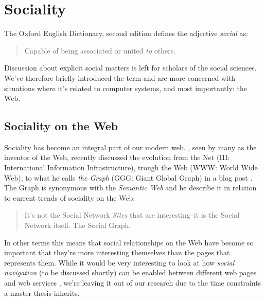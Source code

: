 \section{Sociality}

The Oxford English Dictionary, second edition \citep[p.~905]{simpson89}
defines the adjective \emph{social} as:

\begin{quote}
  Capable of being associated or united \emph{to} others.
\end{quote}

Discussion about explicit social matters is left for scholars of the social
sciences. We've therefore briefly introduced the term and are more concerned
with situations where it's related to computer systems, and most importantly:
the Web.

\subsection{Sociality on the Web}

Sociality has become an integral part of our modern web.
\citeauthor{bernerslee07}, seen by many as the inventor of the Web,
recently discussed the evolution from the Net (III: International
Information Infrastructure), trough the Web (WWW: World Wide Web),
to what he calls \emph{the Graph} (GGG: Giant Global Graph) in a
blog post \citeyearpar{bernerslee07}. The Graph is synonymous with the
\emph{Semantic Web}%
and he describe it in relation to
current trends of sociality on the Web:
\begin{quote}
  It's not the Social Network \emph{Sites} that are interesting--it is the
  Social Network itself. The Social Graph. \citep{bernerslee01}
\end{quote}

In other terms this means that social relationships on the Web have become so
important that they're more interesting themselves than the pages that
represents them. While it would be very interesting to look at how
\emph{social navigation} (to be discussed shortly) can be enabled between
different web pages and web services%
, we're leaving it out of our research
due to the time constraints a master thesis inherits.

